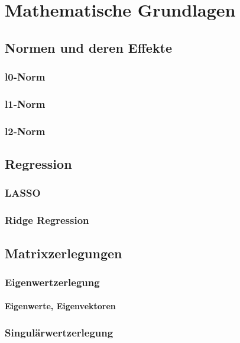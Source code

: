 \chapter{Mathematische Grundlagen}

\label{fundamentals}

\section{Normen und deren Effekte}

\subsection{l0-Norm}
\subsection{l1-Norm}
\subsection{l2-Norm}

\section{Regression}

\subsection{LASSO}
\subsection{Ridge Regression}

\section{Matrixzerlegungen}

\subsection{Eigenwertzerlegung}
\subsubsection{Eigenwerte, Eigenvektoren}
\subsection{Singulärwertzerlegung}
